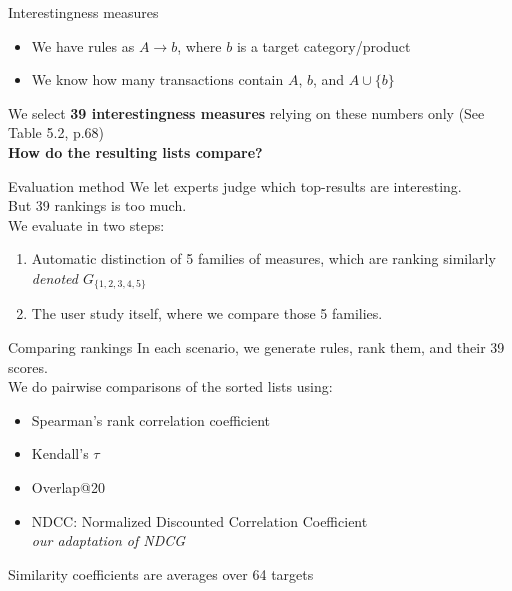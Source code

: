 \documentclass[table]{beamer}
\begin{document}
\begin{frame}{Interestingness measures }
  \begin{itemize}
    \item We have rules as $A \rightarrow b$, where $b$ is a target category/product
    \item We know how many transactions contain $A$, $b$, and $A \cup \{b\}$
  \end{itemize}
  \pause
  We select {\bf 39 interestingness measures} relying on these numbers only (See Table 5.2, p.68) \\
  {\bf How do the resulting lists compare?}
\end{frame}

\begin{frame}{Evaluation method}
  We let experts judge which top-results are interesting.\\
  But 39 rankings is too much.\\
  \vspace{0.5cm}
  \pause
  We evaluate in two steps:
  \begin{enumerate}
    \item Automatic distinction of 5 families of measures, which are ranking similarly\\
    {\em denoted $G_{\{1,2,3,4,5\}}$}
    \item The user study itself, where we compare those 5 families.
  \end{enumerate}
\end{frame}


\begin{frame}{Comparing rankings}
  In each scenario, we generate rules, rank them, and their 39 scores.\\
  \vspace{1cm}
  We do pairwise comparisons of the sorted lists using:
  \begin{itemize}
    \item Spearman's rank correlation coefficient
    \item Kendall's $\tau$
    \item Overlap@20
    \item NDCC: Normalized Discounted Correlation Coefficient\\
      {\em our adaptation of NDCG\cite{Jarvelin:2002:CGE:582415.582418}}
  \end{itemize}

  \pause
  Similarity coefficients are averages over 64 targets %
\end{frame}
\end{document}
